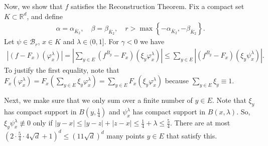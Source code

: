 Now, we show that $f$ satisfies the Reconstruction Theorem. Fix a compact set $K \subset \mathbb{R}^d$, and define 
\begin{align}\label{tropicalGeometryie}
    \alpha = \alpha_{\bar K_2}, \quad \beta = \beta_{\bar K_2}, \quad r > \max\left\{ -\alpha_{\bar K_2}, -\beta_{\bar K_2} \right\}.
\end{align}
Let $\psi \in \mathcal{B}_r$, $x \in K$ and $\lambda \in (0,1]$. For $\gamma < 0$ we have
\begin{align}\label{AbbaHunter}
    |(f-F_x)(\varphi^\lambda_x)| = |\sum_{y \in E} (f^{B_y} - F_x)(\xi_y \varphi^\lambda_x)| \leq \sum_{y \in E} | (f^{B_y} - F_x)(\xi_y \psi^\lambda_x) |.
\end{align} 
To justify the first equality, note that $F_x(\varphi^\lambda_x) = F_x(\sum_{y \in E} \xi_y \varphi^\lambda_x) = \sum_{y \in E}F_x(\xi_y \varphi^\lambda_x)$ because $\sum_{y \in E}\xi_y \equiv 1$.

Next, we make sure that we only sum over a finite number of $y \in E$. Note that $\xi_y$ has compact support in $B(y, \frac{1}{4})$ and $\psi^\lambda_x$ has compact support in $B(x, \lambda)$. So, $\xi_y \psi^\lambda_x \not \equiv 0$ only if $|y-x| \leq |y - z| + |z-x| \leq \frac{1}{4} + \lambda \leq \frac{5}{4}$. There are at most $(2 \cdot \frac{5}{4} \cdot 4 \sqrt{d} + 1)^d \leq (11 \sqrt{d})^d$ many points $y \in E$ that satisfy this. 

